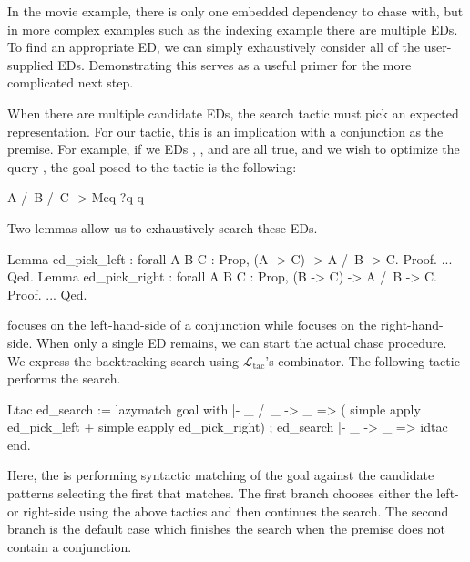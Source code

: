 \documentclass[preprint]{sigplanconf}
\newcommand{\ltac}[0]{\ensuremath{\mathcal{L}_{\mathrm{tac}}}}
\begin{document}
In the movie example, there is only one embedded dependency to chase with, but in more complex examples such as the indexing example there are multiple EDs.
To find an appropriate ED, we can simply exhaustively consider all of the user-supplied EDs.
Demonstrating this serves as a useful primer for the more complicated next step.

When there are multiple candidate EDs, the search tactic must pick an expected representation.
For our tactic, this is an implication with a conjunction as the premise.
For example, if we EDs , , and  are all true, and we wish to optimize the query , the goal posed to the tactic is the following:
\begin{coq}
A /\ B /\ C -> Meq ?q q
\end{coq}

Two lemmas allow us to exhaustively search these EDs.
\begin{coq}
Lemma ed_pick_left : forall {A B C : Prop},
  (A -> C) ->
  A /\ B -> C.
Proof. ... Qed.
Lemma ed_pick_right : forall {A B C : Prop},
  (B -> C) ->
  A /\ B -> C.
Proof. ... Qed.
\end{coq}
 focuses on the left-hand-side of a conjunction while  focuses on the right-hand-side.
When only a single ED remains, we can start the actual chase procedure.
We express the backtracking search using \ltac's \coqe{+} combinator.
The following tactic performs the search.
\begin{coq}
Ltac ed_search :=
  lazymatch goal with
  |- _ /\ _ -> _ =>
    (  simple apply ed_pick_left
     + simple eapply ed_pick_right) ; ed_search
  |- _ -> _ => idtac
  end.
\end{coq}
Here, the  is performing syntactic matching of the goal against the candidate patterns selecting the first that matches.
The first branch chooses either the left- or right-side using the above tactics and then continues the search.
The second branch is the default case which finishes the search when the premise does not contain a conjunction.

\end{document}
